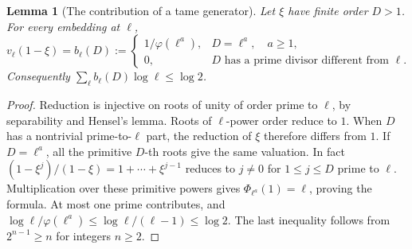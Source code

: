 \documentclass[a4paper,11pt]{article}
\newtheorem{lemma}[proposition]{Lemma}
\theoremstyle{definition}
\theoremstyle{remark}
\numberwithin{equation}{section}
\begin{document}
\begin{lemma}[The contribution of a tame generator]\leavevmode
\label{lem:tametraceheight734}
Let \(\xi\) have finite order \(D>1\). For every embedding at \(\ell\),
\[
 v_\ell(1-\xi)=
 b_\ell(D):=
 \begin{cases}
   1/\varphi(\ell^a),&D=\ell^a,\quad a\ge1,\\
   0,&D\text{ has a prime divisor different from }\ell .
 \end{cases}
\]
Consequently \(\sum_\ell b_\ell(D)\log\ell\le\log 2\).
\end{lemma}
\begin{proof}
Reduction is injective on roots of unity of order prime to \(\ell\),
by separability and Hensel's lemma. Roots of \(\ell\)-power order
reduce to \(1\). When \(D\) has a nontrivial prime-to-\(\ell\) part,
the reduction of \(\xi\) therefore differs from \(1\).
If \(D=\ell^a\), all the primitive \(D\)-th roots give the same
valuation. In fact \((1-\xi^j)/(1-\xi)=1+\cdots+\xi^{j-1}\)
reduces to \(j\ne0\) for \(1\le j\le D\) prime to \(\ell\).
Multiplication over these primitive powers gives
\(\Phi_{\ell^a}(1)=\ell\), proving the formula. At most one prime
contributes, and \(\log\ell/\varphi(\ell^a)\le\log\ell/(\ell-1)
\le\log2\). The last inequality follows from \(2^{n-1}\ge n\)
for integers \(n\ge2\).
\end{proof}
\end{document}
